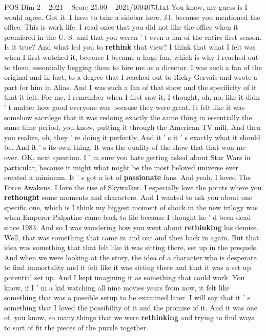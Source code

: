 \begin{textsample}{POS Dim 2 – 2021 – Score 25.00 – 2021/t004073.txt}
You know, my guess is I would agree.
Got it.
I have to take a sidebar here, JJ, because you mentioned the office.
This is work life.
I read once that you did not like the office when it premiered in the U.
S. and that you weren ' t even a fan of the entire first season.
Is it true?
And what led you to \textbf{rethink} that view?
I think that what I felt was when I first watched it, because I became a huge fan, which is why I reached out to them, essentially begging them to hire me as a director.
I was such a fan of the original and in fact, to a degree that I reached out to Ricky Gervais and wrote a part for him in Alias.
And I was such a fan of that show and the specificity of it that it felt.
For me, I remember when I first saw it, I thought, oh, no, like it didn ' t matter how good everyone was because they were great.
It felt like it was somehow sacrilege that it was redoing exactly the same thing in essentially the same time period, you know, putting it through the American TV mill.
And then you realize, oh, they ' re doing it perfectly.
And it ' s it ' s exactly what it should be.
And it ' s its own thing.
It was the quality of the show that that won me over.
OK, next question.
I ' m sure you hate getting asked about Star Wars in particular, because it might what might be the most beloved universe ever created a minimum.
It ' s got a lot of \textbf{passionate} fans.
And yeah, I loved The Force Awakens.
I love the rise of Skywalker.
I especially love the points where you \textbf{rethought} some moments and characters.
And I wanted to ask you about one specific one, which is I think my biggest moment of shock in the new trilogy was when Emperor Palpatine came back to life because I thought he ' d been dead since 1983.
And so I was wondering how you went about \textbf{rethinking} his demise.
Well, that was something that came in and out and then back in again.
But that idea was something that that felt like it was sitting there, set up in the prequels.
And when we were looking at the story, the idea of a character who is desperate to find immortality and it felt like it was sitting there and that it was a set up potential set up.
And I kept imagining it as something that could work.
You know, if I ' m a kid watching all nine movies years from now, it felt like something that was a possible setup to be examined later.
I will say that it ' s something that I loved the possibility of it and the promise of it.
And it was one of, you know, so many things that we were \textbf{rethinking} and trying to find ways to sort of fit the pieces of the puzzle together.

\end{textsample}
